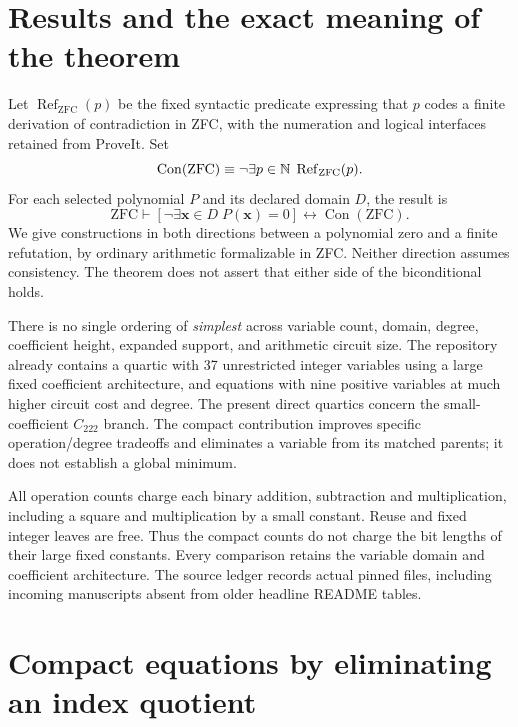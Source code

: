 \documentclass[11pt]{article}
\theoremstyle{remark}\newtheorem{remark}[theorem]{Remark}
\newcommand{\Con}{\operatorname{Con}}\newcommand{\lcm}{\operatorname{lcm}}
\newcommand{\Refutes}{\operatorname{Ref}}
\begin{document}
\section{Results and the exact meaning of the theorem}

Let $\Refutes_{\mathrm{ZFC}}(p)$ be the fixed syntactic predicate expressing
that $p$ codes a finite derivation of contradiction in ZFC, with the
numeration and logical interfaces retained from ProveIt. Set
\[
 \Con(\mathrm{ZFC})\equiv
 \neg\exists p\in\N\;\Refutes_{\mathrm{ZFC}}(p).
\]
For each selected polynomial $P$ and its declared domain $D$, the result is
\begin{equation}\label{eq:target}
 \mathrm{ZFC}\vdash
 \left[\neg\exists\mathbf x\in D\;P(\mathbf x)=0\right]
 \longleftrightarrow\Con(\mathrm{ZFC}).
\end{equation}
We give constructions in both directions between a polynomial zero and
a finite refutation, by ordinary arithmetic formalizable in ZFC.
Neither direction assumes consistency. The theorem does not assert
that either side of the biconditional holds.



There is no single ordering of \emph{simplest} across variable count,
domain, degree, coefficient height, expanded support, and arithmetic
circuit size. The repository already contains a quartic with 37
unrestricted integer variables using a large fixed coefficient
architecture, and equations with nine positive variables at much
higher circuit cost and degree. The present direct quartics concern
the small-coefficient $C_{222}$ branch. The compact contribution improves
specific operation/degree tradeoffs and eliminates a variable from its
matched parents; it does not establish a global minimum.

All operation counts charge each binary addition, subtraction and
multiplication, including a square and multiplication by a small
constant. Reuse and fixed integer leaves are free. Thus the compact
counts do not charge the bit lengths of their large fixed constants.
Every comparison retains the variable domain and coefficient architecture.
The source ledger records actual pinned files, including incoming
manuscripts absent from older headline README tables.

\section{Compact equations by eliminating an index quotient}\label{sec:quotient}

\end{document}
